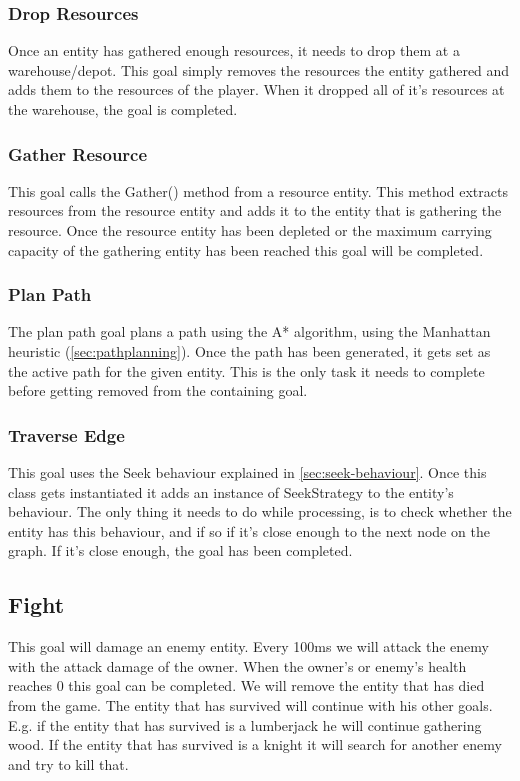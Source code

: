\subsubsection{Drop Resources}
\label{sec:dropresources}
Once an entity has gathered enough resources, it needs to drop them at a 
warehouse/depot. This goal simply removes the resources the entity gathered and adds them to the resources of the player. When it dropped all of it's resources at the warehouse, the goal is completed.

\subsubsection{Gather Resource}
\label{sec:gatherresource}
This goal calls the Gather() method from a resource entity. This method extracts resources from the resource entity and adds it to the entity that is gathering the resource. Once the resource entity has been depleted or the maximum carrying capacity of the gathering entity has been reached this goal will be completed.

\subsubsection{Plan Path}
\label{sec:planpath}
The plan path goal plans a path using the A* algorithm, using the Manhattan 
heuristic (\cref{sec:pathplanning}). Once the path has been generated, it gets set as the active path 
for the given entity. This is the only task it needs to complete before 
getting removed from the containing goal.

\subsubsection{Traverse Edge}
\label{sec:traverseedge}
This goal uses the Seek behaviour explained in \cref{sec:seek-behaviour}. Once 
this class gets instantiated it adds an instance of SeekStrategy to the 
entity's behaviour. The only thing it needs to do while processing, is 
to check whether the entity has this behaviour, and if so if it's close 
enough to the next node on the graph. If it's close enough, the goal has been 
completed.

\subsection{Fight}
\label{sec:fight}
This goal will damage an enemy entity. Every 100ms we will attack the enemy with the attack damage of the owner. When the owner’s or enemy’s health reaches 0 this goal can be completed. We will remove the entity that has died from the game. The entity that has survived will continue with his other goals. E.g. if the entity that has survived is a lumberjack he will continue gathering wood. If the entity that has survived is a knight it will search for another enemy and try to kill that.
